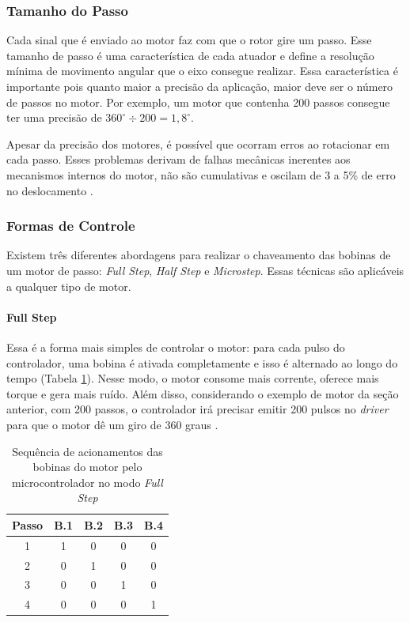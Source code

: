 \subsubsection{Tamanho do Passo}
Cada sinal que é enviado ao motor faz com que o rotor gire um passo. Esse tamanho de passo é uma característica de cada atuador e define a resolução mínima de movimento angular que o eixo consegue realizar. Essa característica é importante pois quanto maior a precisão da aplicação, maior deve ser o número de passos no motor. Por exemplo, um motor que contenha 200 passos consegue ter uma precisão de $ 360^{\circ} \div 200 = 1,8 ^{\circ} $.

Apesar da precisão dos motores, é possível que ocorram erros ao rotacionar em cada passo. Esses problemas derivam de falhas mecânicas inerentes aos mecanismos internos do motor, não são cumulativas e oscilam de 3 a 5\% de erro no deslocamento \cite{man:advancedmicrosystemStepControl}.

\subsubsection{Formas de Controle}
Existem três diferentes abordagens para realizar o chaveamento das bobinas de um motor de passo: \textit{Full Step}, \textit{Half Step} e \textit{Microstep}. Essas técnicas são aplicáveis a qualquer tipo de motor.

\paragraph{Full Step}
Essa é a forma mais simples de controlar o motor: para cada pulso do controlador, uma bobina é ativada completamente e isso é alternado ao longo do tempo (Tabela \ref{tab:fs}). Nesse modo, o motor consome mais corrente, oferece mais torque e gera mais ruído. Além disso, considerando o exemplo de motor da seção anterior, com 200 passos, o controlador irá precisar emitir 200 pulsos no \textit{driver} para que o motor dê um giro de 360 graus \cite{man:advancedmicrosystemStepControl}.

\begin{table}[!htb]
	\centering
	\caption{Sequência de acionamentos das bobinas do motor pelo microcontrolador no modo \textit{Full Step}}
	\begin{tabular}{c|c|c|c|c}
		Passo & B.1 & B.2 & B.3 & B.4 \\\hline
		1	& 1 & 0 & 0 & 0\\
		2	& 0 & 1 & 0 & 0\\
		3	& 0 & 0 & 1 & 0\\
		4	& 0 & 0	& 0 & 1		\\
	\end{tabular}
	\label{tab:fs}
\end{table}


